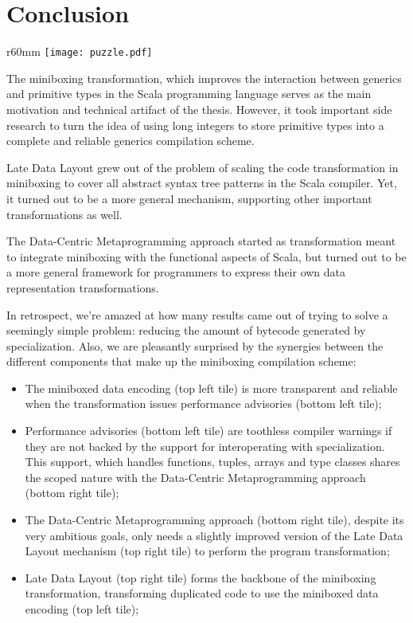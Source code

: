 \chapter{Conclusion}
\label{chapter:concl}

\begin{wrapfigure}{r}{60mm}
  \centering
  \vspace{-27em}
  \texttt{[image: puzzle.pdf]}
  \vspace{-30em}
\end{wrapfigure}

The miniboxing transformation, which improves the interaction between generics and primitive types in the Scala programming language serves as the main motivation and technical artifact of the thesis. However, it took important side research to turn the idea of using long integers to store primitive types into a complete and reliable generics compilation scheme.

Late Data Layout grew out of the problem of scaling the code transformation in miniboxing to cover all abstract syntax tree patterns in the Scala compiler. Yet, it turned out to be a more general mechanism, supporting other important transformations as well.

The Data-Centric Metaprogramming approach started as transformation meant to integrate miniboxing with the functional aspects of Scala, but turned out to be a more general framework for programmers to express their own data representation transformations.

In retrospect, we're amazed at how many results came out of trying to solve a seemingly simple problem: reducing the amount of bytecode generated by specialization. Also, we are pleasantly surprised by the synergies between the different components that make up the miniboxing compilation scheme:

\begin{itemize}
  \item The miniboxed data encoding (top left tile) is more transparent and reliable when the transformation issues performance advisories (bottom left tile);
  \item Performance advisories (bottom left tile) are toothless compiler warnings if they are not backed by the support for interoperating with specialization. This support, which handles functions, tuples, arrays and type classes shares the scoped nature with the Data-Centric Metaprogramming approach (bottom right tile);
  \item The Data-Centric Metaprogramming approach (bottom right tile), despite its very ambitious goals, only needs a slightly improved version of the Late Data Layout mechanism (top right tile) to perform the program transformation;
  \item Late Data Layout (top right tile) forms the backbone of the miniboxing transformation, transforming duplicated code to use the miniboxed data encoding (top left tile);
\end{itemize}

